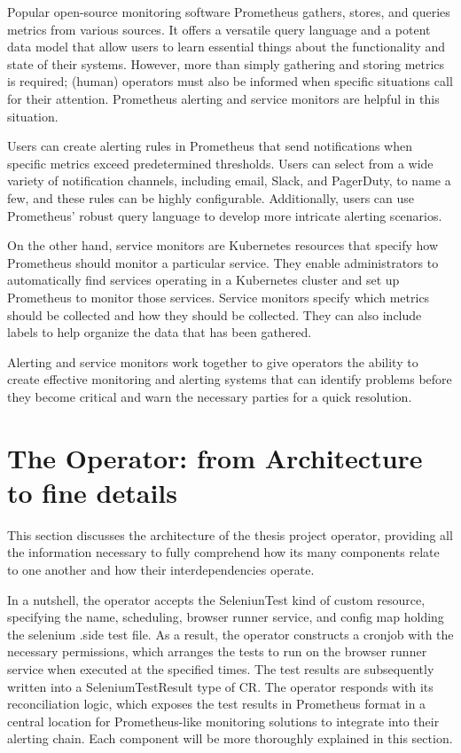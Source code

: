 Popular open-source monitoring software Prometheus gathers, stores, and queries metrics from various sources. It offers a versatile query language and a potent data model that allow users to learn essential things about the functionality and state of their systems. However, more than simply gathering and storing metrics is required; (human) operators must also be informed when specific situations call for their attention. Prometheus alerting and service monitors are helpful in this situation.

Users can create alerting rules in Prometheus that send notifications when specific metrics exceed predetermined thresholds. Users can select from a wide variety of notification channels, including email, Slack, and PagerDuty, to name a few, and these rules can be highly configurable. Additionally, users can use Prometheus' robust query language to develop more intricate alerting scenarios.

On the other hand, service monitors are Kubernetes resources that specify how Prometheus should monitor a particular service. They enable administrators to automatically find services operating in a Kubernetes cluster and set up Prometheus to monitor those services. Service monitors specify which metrics should be collected and how they should be collected. They can also include labels to help organize the data that has been gathered.

Alerting and service monitors work together to give operators the ability to create effective monitoring and alerting systems that can identify problems before they become critical and warn the necessary parties for a quick resolution.


\section{The Operator: from Architecture to fine details}

This section discusses the architecture of the thesis project operator, providing all the information necessary to fully comprehend how its many components relate to one another and how their interdependencies operate.

In a nutshell, the operator accepts the SeleniunTest kind of custom resource, specifying the name, scheduling, browser runner service, and config map holding the selenium .side test file. As a result, the operator constructs a cronjob with the necessary permissions, which arranges the tests to run on the browser runner service when executed at the specified times. The test results are subsequently written into a SeleniumTestResult type of CR. The operator responds with its reconciliation logic, which exposes the test results in Prometheus format in a central location for Prometheus-like monitoring solutions to integrate into their alerting chain. Each component will be more thoroughly explained in this section.

